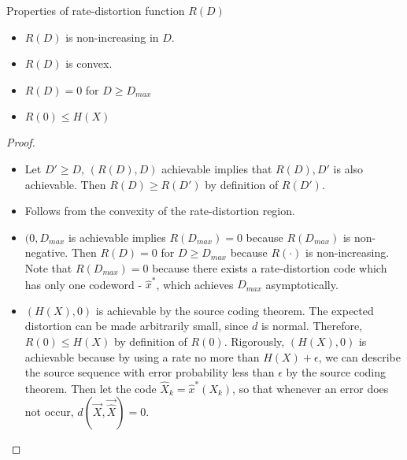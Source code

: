 \documentclass[../main.tex]{subfiles}
\begin{document}
\begin{bbox}{Properties of rate-distortion function $R(D)$}
\begin{itemize}
    \item $R(D)$ is non-increasing in $D$.
    \item $R(D)$ is convex.
    \item $R(D)=0$ for $D\geq D_{max}$
    \item $R(0)\leq H(X)$
\end{itemize}    
\begin{proof}
    \begin{itemize}
        \item Let $D'\geq D$, $(R(D),D)$ achievable implies that $R(D),D'$ is also achievable. Then $R(D)\geq R(D')$ by definition of $R(D')$.
        \item Follows from the convexity of the rate-distortion region.
        \item $(0, D_{max}$ is achievable implies $R(D_{max})=0$ because $R(D_{max})$ is non-negative. Then $R(D)=0$ for $D\geq D_{max}$ because $R(\cdot)$ is non-increasing.
        \newline
        Note that $R(D_{max})=0$ because there exists a rate-distortion code which has only one codeword - $\hat x^*$, which achieves $D_{max}$ asymptotically.
        \item $(H(X),0)$ is achievable by the source coding theorem. The expected distortion can be made arbitrarily small, since $d$ is normal. Therefore, $R(0)\leq H(X)$ by definition of $R(0)$.
        \newline
        Rigorously, $(H(X),0)$ is achievable because by using a rate no more than $H(X)+\epsilon$, we can describe the source sequence with error probability less than $\epsilon$ by the source coding theorem. Then let the code $\hat X_k = \hat x^*(X_k)$, so that whenever an error does not occur, $d(\vec X, \vec{\hat X})=0$.
    \end{itemize}
\end{proof}
\end{bbox}
\end{document}
